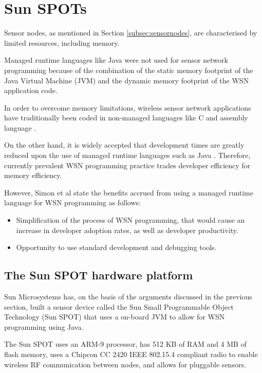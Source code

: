 \section {Sun SPOTs} \label{sec:sunspots}

Sensor nodes, as mentioned in Section \ref{subsec:sensornodes}, are
characterised by limited resources, including memory.
 
Managed runtime languages like Java were not used for sensor network programming
because of the combination of the static memory footprint of the Java Virtual
Machine (JVM) and the dynamic memory footprint of the WSN application code.

In order to overcome
memory limitations, wireless sensor network applications have traditionally been
 coded in non-managed languages like C and assembly language
 \cite{simon_squawk:2006}. 
 
 On the other hand, it is widely accepted that development times are greatly reduced
upon the use of managed runtime languages such as Java
\cite{simon_squawk:2006}. Therefore, currently prevalent WSN programming practice
trades developer efficiency for memory efficiency. 

However, Simon et al \cite{simon_squawk:2006} state the benefits accrued from
using a managed runtime language for WSN programming as follows:

\begin{itemize}
  \item Simplification of the process of WSN programming, that would cause an
  increase in developer adoption rates, as well as developer productivity.
  \item Opportunity to use standard development and debugging tools.
\end{itemize}
 
\subsection{The Sun SPOT hardware platform }
Sun Microsystems has, on the basis of the arguments discussed in the previous
section, built a sensor device
called the Sun Small Programmable Object Technology (Sun SPOT) that uses a
on-board JVM to allow for WSN programming using Java.

The Sun SPOT uses an ARM-9 processor, has 512 KB of RAM and 4 MB of flash
memory, uses a Chipcon CC 2420 IEEE 802.15.4 compliant radio to enable
wireless RF communication between nodes, and allows for pluggable sensors.

